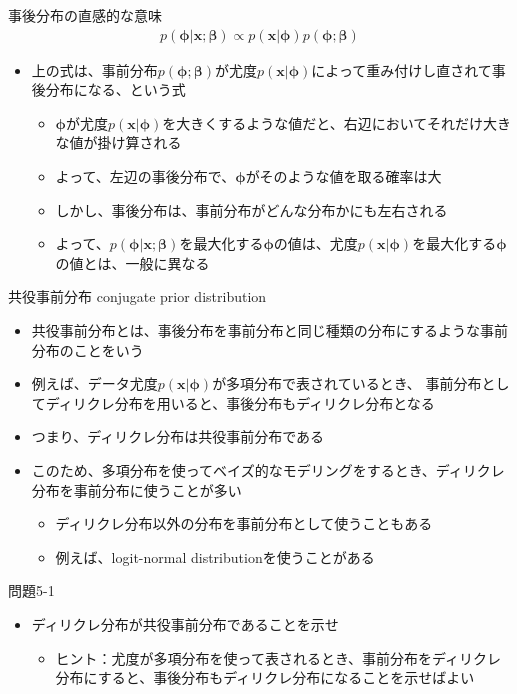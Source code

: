\documentclass[aspectratio=169,unicode,dvipdfmx,14pt]{beamer}
\begin{document}
\begin{frame}{事後分布の直感的な意味}
\vspace{-.2in}
\begin{align}
p(\bm{\phi}|\bm{x};\bm{\beta}) \propto p(\bm{x}|\bm{\phi})p(\bm{\phi};\bm{\beta})
\end{align}
\vspace{-.2in}
\begin{itemize}
\item 上の式は、事前分布$p(\bm{\phi};\bm{\beta})$が尤度$p(\bm{x}|\bm{\phi})$によって重み付けし直されて事後分布になる、という式
\begin{itemize}
\item $\bm{\phi}$が尤度$p(\bm{x}|\bm{\phi})$を大きくするような値だと、右辺においてそれだけ大きな値が掛け算される
\item よって、左辺の事後分布で、$\bm{\phi}$がそのような値を取る確率は大
\item しかし、事後分布は、事前分布がどんな分布かにも左右される
\item よって、$p(\bm{\phi}|\bm{x};\bm{\beta})$を最大化する$\bm{\phi}$の値は、尤度$p(\bm{x}|\bm{\phi})$を最大化する$\bm{\phi}$の値とは、一般に異なる
\end{itemize}
\end{itemize}
\end{frame}

\begin{frame}{共役事前分布 conjugate prior distribution}
\begin{itemize}
\item 共役事前分布とは、事後分布を事前分布と同じ種類の分布にするような事前分布のことをいう
\item 例えば、データ尤度$p(\bm{x}|\bm{\phi})$が多項分布で表されているとき、
事前分布としてディリクレ分布を用いると、事後分布もディリクレ分布となる
\item つまり、ディリクレ分布は共役事前分布である
\item このため、多項分布を使ってベイズ的なモデリングをするとき、ディリクレ分布を事前分布に使うことが多い
\begin{itemize}
\item ディリクレ分布以外の分布を事前分布として使うこともある
\item 例えば、logit-normal distributionを使うことがある
\end{itemize}
\end{itemize}
\end{frame}

\begin{frame}{問題5-1}
\begin{itemize}
\item ディリクレ分布が共役事前分布であることを示せ
\begin{itemize}
\item ヒント：尤度が多項分布を使って表されるとき、事前分布をディリクレ分布にすると、事後分布もディリクレ分布になることを示せばよい
\end{itemize}
\end{itemize}
\end{frame}
\end{document}

